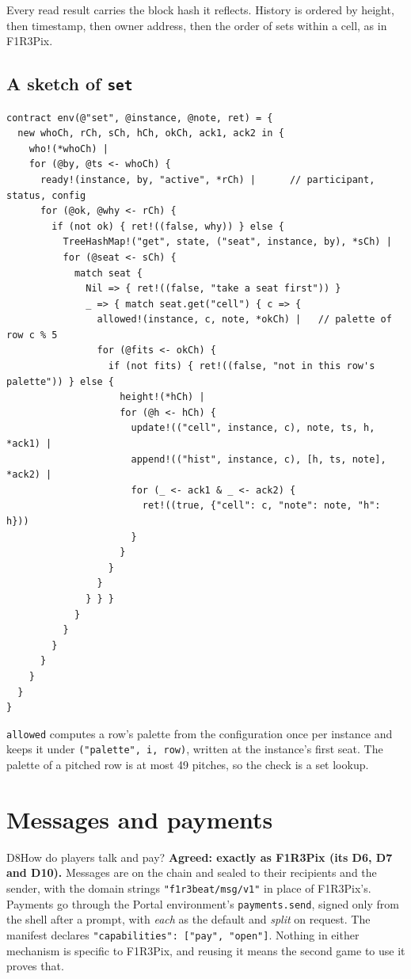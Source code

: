 \documentclass[11pt,a4paper]{article}
\newcommand{\code}[1]{\texttt{#1}}
\newcounter{req}
\begin{document}
Every read result carries the block hash it reflects. History is ordered by height, then
timestamp, then owner address, then the order of sets within a cell, as in F1R3Pix.

\subsection{A sketch of \code{set}}

\begin{lstlisting}[language=rholang]
contract env(@"set", @instance, @note, ret) = {
  new whoCh, rCh, sCh, hCh, okCh, ack1, ack2 in {
    who!(*whoCh) |
    for (@by, @ts <- whoCh) {
      ready!(instance, by, "active", *rCh) |      // participant, status, config
      for (@ok, @why <- rCh) {
        if (not ok) { ret!((false, why)) } else {
          TreeHashMap!("get", state, ("seat", instance, by), *sCh) |
          for (@seat <- sCh) {
            match seat {
              Nil => { ret!((false, "take a seat first")) }
              _ => { match seat.get("cell") { c => {
                allowed!(instance, c, note, *okCh) |   // palette of row c % 5
                for (@fits <- okCh) {
                  if (not fits) { ret!((false, "not in this row's palette")) } else {
                    height!(*hCh) |
                    for (@h <- hCh) {
                      update!(("cell", instance, c), note, ts, h, *ack1) |
                      append!(("hist", instance, c), [h, ts, note], *ack2) |
                      for (_ <- ack1 & _ <- ack2) {
                        ret!((true, {"cell": c, "note": note, "h": h}))
                      }
                    }
                  }
                }
              } } }
            }
          }
        }
      }
    }
  }
}
\end{lstlisting}

\code{allowed} computes a row's palette from the configuration once per instance and keeps it
under \code{("palette", i, row)}, written at the instance's first seat. The palette of a pitched
row is at most 49 pitches, so the check is a set lookup.

\section{Messages and payments}\label{sec:mail}

\begin{decision}{D8}{How do players talk and pay?}
\textbf{Agreed: exactly as F1R3Pix (its D6, D7 and D10).} Messages are on the chain and
sealed to their recipients and the sender, with the domain strings \code{"f1r3beat/msg/v1"} in
place of F1R3Pix's. Payments go through the Portal environment's \code{payments.send}, signed
only from the shell after a prompt, with \emph{each} as the default and \emph{split} on
request. The manifest declares \code{"capabilities": ["pay", "open"]}. Nothing in either
mechanism is specific to F1R3Pix, and reusing it means the second game to use it proves that.
\end{decision}
\end{document}
